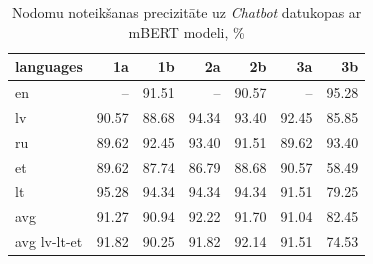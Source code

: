 \begin{table}[htbp]
  \centering
  \caption{Nodomu noteikšanas precizitāte uz \textit{Chatbot} datukopas ar mBERT modeli, \%}
    \begin{tabular}{lrrrrrr} \toprule
    languages & 1a & 1b & 2a & 2b & 3a & 3b \\\midrule
    en    &  --   & \cellcolor[rgb]{ .988,  .988,  1}91.51 &    -- & \cellcolor[rgb]{ .984,  .969,  .98}90.57 &  --   & \cellcolor[rgb]{ .353,  .541,  .776}95.28 \\
    lv    & \cellcolor[rgb]{ .984,  .969,  .98}90.57 & \cellcolor[rgb]{ .984,  .937,  .949}88.68 & \cellcolor[rgb]{ .514,  .655,  .835}94.34 & \cellcolor[rgb]{ .671,  .765,  .89}93.40 & \cellcolor[rgb]{ .831,  .878,  .945}92.45 & \cellcolor[rgb]{ .984,  .886,  .898}85.85 \\
    ru    & \cellcolor[rgb]{ .984,  .953,  .965}89.62 & \cellcolor[rgb]{ .831,  .878,  .945}92.45 & \cellcolor[rgb]{ .671,  .765,  .89}93.40 & \cellcolor[rgb]{ .988,  .988,  1}91.51 & \cellcolor[rgb]{ .984,  .953,  .965}89.62 & \cellcolor[rgb]{ .671,  .765,  .89}93.40 \\
    et    & \cellcolor[rgb]{ .984,  .953,  .965}89.62 & \cellcolor[rgb]{ .984,  .922,  .933}87.74 & \cellcolor[rgb]{ .984,  .906,  .914}86.79 & \cellcolor[rgb]{ .984,  .937,  .949}88.68 & \cellcolor[rgb]{ .984,  .969,  .98}90.57 & \cellcolor[rgb]{ .973,  .412,  .42}58.49 \\
    lt    & \cellcolor[rgb]{ .353,  .541,  .776}95.28 & \cellcolor[rgb]{ .514,  .655,  .835}94.34 & \cellcolor[rgb]{ .514,  .655,  .835}94.34 & \cellcolor[rgb]{ .514,  .655,  .835}94.34 & \cellcolor[rgb]{ .988,  .988,  1}91.51 & \cellcolor[rgb]{ .98,  .773,  .784}79.25 \\\bottomrule
    avg   & 91.27 & 90.94 & 92.22 & 91.70 & 91.04 & 82.45 \\
    avg lv-lt-et & 91.82 & 90.25 & 91.82 & 92.14 & 91.51 & 74.53 \\
    \end{tabular}%
  \label{tab:chatbot-bert}%
\end{table}%



